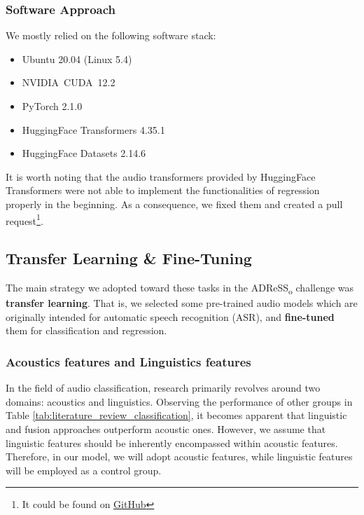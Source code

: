 \documentclass[journal]{IEEEtran}
\begin{document}

\subsubsection{Software Approach}

We mostly relied on the following software stack:

\begin{itemize}
    \item Ubuntu 20.04 (Linux 5.4)
    \item NVIDIA\textregistered~CUDA\textregistered~12.2
    \item PyTorch 2.1.0\cite{PyTorch}
    \item HuggingFace Transformers 4.35.1\cite{wolf-etal-2020-transformers}
    \item HuggingFace Datasets 2.14.6\cite{lhoest-etal-2021-datasets}
\end{itemize}

It is worth noting that the audio transformers provided by HuggingFace Transformers were not able to implement the functionalities of regression properly in the beginning. As a consequence, we fixed them and created a pull request\footnote{It could be found on \href{https://github.com/huggingface/transformers/pull/27863}{GitHub}}.

\subsection{Transfer Learning \& Fine-Tuning}

The main strategy we adopted toward these tasks in the ADReSS\textsubscript{o} challenge was \textbf{transfer learning}. That is, we selected some pre-trained audio models which are originally intended for automatic speech recognition (ASR), and \textbf{fine-tuned} them for classification and regression.


\subsubsection{Acoustics features and Linguistics   features}

In the field of audio classification, research primarily revolves around two domains: acoustics and linguistics. Observing the performance of other groups in Table \ref{tab:literature_review_classification}, it becomes apparent that linguistic and fusion approaches outperform acoustic ones. However, we assume that linguistic features should be inherently encompassed within acoustic features. Therefore, in our model, we will adopt acoustic features, while linguistic features will be employed as a control group.
\end{document}
